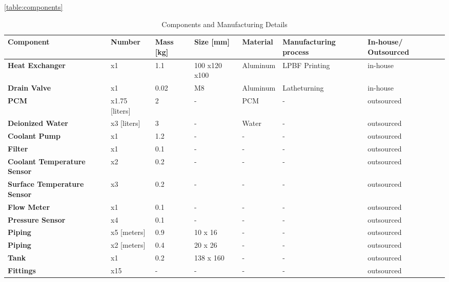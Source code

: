 \autoref{table:components}
\begin{table} [H]
\centering
\caption{Components and Manufacturing Details}
\label{table:components}
\begin{adjustbox}{width=\textwidth,center}
\begin{tabular}{|>{\bfseries}m{2.9cm}|m{2.4cm}|m{1.7cm}|m{2.5cm}|m{2.2cm}|m{2.6cm}|m{2.2cm}|}
\hline
Component & Number & Mass [kg] & Size [mm] & Material & Manufacturing process & In-house/ Outsourced \\
\hline
Heat Exchanger & x1 & 1.1 & 100 x120 x100 & Aluminum & LPBF Printing & in-house \\
Drain Valve & x1 & 0.02 & M8 & Aluminum & Latheturning & in-house \\
PCM & x1.75 [liters] & 2 & - & PCM & - & outsourced \\
Deionized Water & x3 [liters] & 3 & - & Water & - & outsourced \\
Coolant Pump & x1 &1.2 & - & - & - & outsourced \\
Filter &x1 & 0.1 & - & - & - &outsourced \\
Coolant Temperature Sensor & x2 & 0.2 & - & - & - & outsourced \\
Surface Temperature Sensor & x3 & 0.2 & - & - & - & outsourced \\
Flow Meter & x1 & 0.1 & - & - & - & outsourced \\
Pressure Sensor & x4 & 0.1 & - & - & - & outsourced \\
Piping & x5 [meters] & 0.9 &  10 x 16& - & - & outsourced \\
Piping & x2 [meters] & 0.4 & 20 x 26 & - & - & outsourced \\
Tank & x1 & 0.2 & 138 x 160 & - & - & outsourced \\

Fittings & x15 & - & - & - & - & outsourced \\
\hline
\end{tabular}
\end{adjustbox}
\end{table}


